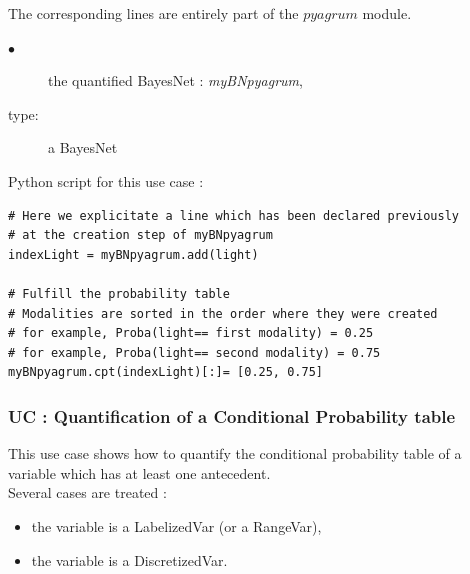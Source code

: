 The corresponding lines are entirely part of the $pyagrum$ module. \\



{
  \begin{description}
  \item[$\bullet$] the quantified BayesNet : {\itshape myBNpyagrum},
  \item[type:] a BayesNet
  \end{description}
}

\espace 
Python  script for this use case :

\begin{lstlisting}
# Here we explicitate a line which has been declared previously
# at the creation step of myBNpyagrum
indexLight = myBNpyagrum.add(light)

# Fulfill the probability table
# Modalities are sorted in the order where they were created
# for example, Proba(light== first modality) = 0.25
# for example, Proba(light== second modality) = 0.75
myBNpyagrum.cpt(indexLight)[:]= [0.25, 0.75]
\end{lstlisting}


\newpage \subsubsection{UC : Quantification of a Conditional Probability table }

This use case shows how to quantify the conditional probability table  of a variable which has at least one antecedent.\\

Several cases are treated : 
\begin{itemize}
  \item the variable is a LabelizedVar (or a RangeVar),
  \item the variable is a DiscretizedVar.
\end{itemize}


